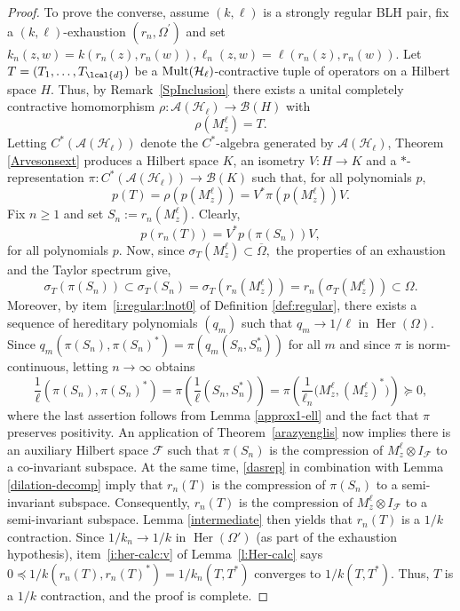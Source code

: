 \documentclass[a4paper,reqno,index]{amsart}
\numberwithin{equation}{section}
\newcommand{\cF}{\mathcal{F}}
\newcommand{\specT}{\sigma_T}  %
\newcommand{\ol}[1]{\overline{#1}}
\newcommand{\Her}{\operatorname{Her}}
\theoremstyle{definition}
\begin{document}
\begin{proof}
To prove the converse, assume $(k, \ell)$ is a strongly regular BLH pair, fix a $(k, \ell)$-exhaustion $(r_n,\Omega^\prime)$ 
and set $k_n(z, w)=k(r_n(z), r_n(w)), \ell_n(z, w)=\ell(r_n(z), r_n(w))$.   Let  $T=(T_1, \dots, T_{\lcal{d}})$ be a $\textup{Mult}(\mathcal{H}_{\ell})$-contractive tuple of operators on a Hilbert space $H$. Thus, by Remark~\ref{SpInclusion} 
there exists a unital completely contractive homomorphism
$\rho: \mathcal{A}(\mathcal{H}_{\ell})\to\mathcal{B}(H)$ with 
\[
 \rho(M_z^{\ell})=T.
\] 
Letting $C^*(\mathcal{A}(\mathcal{H}_{\ell}))$ denote the $C^*$-algebra generated by $\mathcal{A}(\mathcal{H}_{\ell})$,
Theorem \ref{Arvesonsext} produces a Hilbert space $K$, an isometry $V:H\to K$ and a $*$-representation 
$\pi: C^*(\mathcal{A}(\mathcal{H}_{\ell}))\to\mathcal{B}({K})$ such that, for all polynomials $p,$
\[ p(T)=\rho(p(M^{\ell}_z))=V^* \pi(p(M^{\ell}_z))V. \]
 Fix $n\ge 1$ and set $S_n:=r_n(M^{\ell}_z)$. Clearly,
\begin{equation}\label{dasrep}
    p(r_n(T))=V^* p(\pi(S_n))V,
\end{equation}
 for all polynomials $p$. Now, since $\specT(M^{\ell}_z)\subset\ol{\Omega},$  the properties of
 an exhaustion and the Taylor spectrum give,
 \[
  \specT(\pi(S_n))
  \subset \specT(S_n) = \specT(r_n(M_z^\ell))
  = r_n(\specT(M_z^\ell)) \subset\Omega. 
 \]
 Moreover, by item~\ref{i:regular:lnot0} of Definition \ref{def:regular},  there exists a sequence of hereditary polynomials $(q_m)$ such that $q_m\to1/\ell$ in $\Her(\Omega).$ Since $q_m(\pi(S_n), \pi(S_n)^*)=\pi(q_m(S_n, S^*_n))$ for all $m$ and since $\pi$ is norm-continuous, letting $n\to\infty$  obtains
 \[
   \frac{1}{\ell}(\pi(S_n), \pi(S_n)^*)
    = \pi\left ( \frac{1}{\ell}(S_n, S_n^*) \right )
    =\pi\left ( \frac{1}{\ell_n}\big(M^{\ell}_z, (M^{\ell}_z)^*\big) \right ) \succeq 0,
 \]
 where the last assertion follows from Lemma \ref{approx1-ell} and the fact that $\pi$ preserves positivity. An application of Theorem~\ref{arazyenglis} now implies
there is an auxiliary
Hilbert space $\cF$ such that $\pi(S_n)$ is the compression of  $M_z^\ell\otimes I_\cF$ to a co-invariant subspace. At the same time, \eqref{dasrep} in combination with Lemma \ref{dilation-decomp} imply that $r_n(T)$ is the compression of  $\pi(S_n)$ to a semi-invariant subspace. Consequently, $r_n(T)$ is the compression of $M_z^\ell\otimes I_\cF$ to a semi-invariant subspace. Lemma \ref{intermediate} then yields that $r_n(T)$ is a $1/k$ contraction. Since $1/k_n\to1/k$ in $\Her(\Omega')$ (as part 
of the exhaustion hypothesis),
 item~\ref{i:her-calc:v} of Lemma~\ref{l:Her-calc} says $0 \preceq 1/k(r_n(T),r_n(T)^*)=1/k_n(T,T^*)$ converges to $1/k(T,T^*).$  Thus,  $T$ is a $1/k$ contraction, and the proof is complete. 
\end{proof}
 
\end{document}
